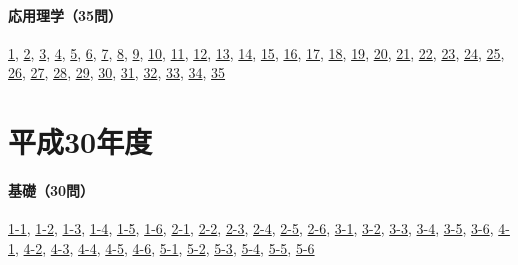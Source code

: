 \paragraph{応用理学（35問）} \hyperref[q:h29-reg-applied-01]{1}, \hyperref[q:h29-reg-applied-02]{2}, \hyperref[q:h29-reg-applied-03]{3}, \hyperref[q:h29-reg-applied-04]{4}, \hyperref[q:h29-reg-applied-05]{5}, \hyperref[q:h29-reg-applied-06]{6}, \hyperref[q:h29-reg-applied-07]{7}, \hyperref[q:h29-reg-applied-08]{8}, \hyperref[q:h29-reg-applied-09]{9}, \hyperref[q:h29-reg-applied-10]{10}, \hyperref[q:h29-reg-applied-11]{11}, \hyperref[q:h29-reg-applied-12]{12}, \hyperref[q:h29-reg-applied-13]{13}, \hyperref[q:h29-reg-applied-14]{14}, \hyperref[q:h29-reg-applied-15]{15}, \hyperref[q:h29-reg-applied-16]{16}, \hyperref[q:h29-reg-applied-17]{17}, \hyperref[q:h29-reg-applied-18]{18}, \hyperref[q:h29-reg-applied-19]{19}, \hyperref[q:h29-reg-applied-20]{20}, \hyperref[q:h29-reg-applied-21]{21}, \hyperref[q:h29-reg-applied-22]{22}, \hyperref[q:h29-reg-applied-23]{23}, \hyperref[q:h29-reg-applied-24]{24}, \hyperref[q:h29-reg-applied-25]{25}, \hyperref[q:h29-reg-applied-26]{26}, \hyperref[q:h29-reg-applied-27]{27}, \hyperref[q:h29-reg-applied-28]{28}, \hyperref[q:h29-reg-applied-29]{29}, \hyperref[q:h29-reg-applied-30]{30}, \hyperref[q:h29-reg-applied-31]{31}, \hyperref[q:h29-reg-applied-32]{32}, \hyperref[q:h29-reg-applied-33]{33}, \hyperref[q:h29-reg-applied-34]{34}, \hyperref[q:h29-reg-applied-35]{35}
\section{平成30年度}
\paragraph{基礎（30問）} \hyperref[q:h30-reg-basic-1-1]{1-1}, \hyperref[q:h30-reg-basic-1-2]{1-2}, \hyperref[q:h30-reg-basic-1-3]{1-3}, \hyperref[q:h30-reg-basic-1-4]{1-4}, \hyperref[q:h30-reg-basic-1-5]{1-5}, \hyperref[q:h30-reg-basic-1-6]{1-6}, \hyperref[q:h30-reg-basic-2-1]{2-1}, \hyperref[q:h30-reg-basic-2-2]{2-2}, \hyperref[q:h30-reg-basic-2-3]{2-3}, \hyperref[q:h30-reg-basic-2-4]{2-4}, \hyperref[q:h30-reg-basic-2-5]{2-5}, \hyperref[q:h30-reg-basic-2-6]{2-6}, \hyperref[q:h30-reg-basic-3-1]{3-1}, \hyperref[q:h30-reg-basic-3-2]{3-2}, \hyperref[q:h30-reg-basic-3-3]{3-3}, \hyperref[q:h30-reg-basic-3-4]{3-4}, \hyperref[q:h30-reg-basic-3-5]{3-5}, \hyperref[q:h30-reg-basic-3-6]{3-6}, \hyperref[q:h30-reg-basic-4-1]{4-1}, \hyperref[q:h30-reg-basic-4-2]{4-2}, \hyperref[q:h30-reg-basic-4-3]{4-3}, \hyperref[q:h30-reg-basic-4-4]{4-4}, \hyperref[q:h30-reg-basic-4-5]{4-5}, \hyperref[q:h30-reg-basic-4-6]{4-6}, \hyperref[q:h30-reg-basic-5-1]{5-1}, \hyperref[q:h30-reg-basic-5-2]{5-2}, \hyperref[q:h30-reg-basic-5-3]{5-3}, \hyperref[q:h30-reg-basic-5-4]{5-4}, \hyperref[q:h30-reg-basic-5-5]{5-5}, \hyperref[q:h30-reg-basic-5-6]{5-6}
